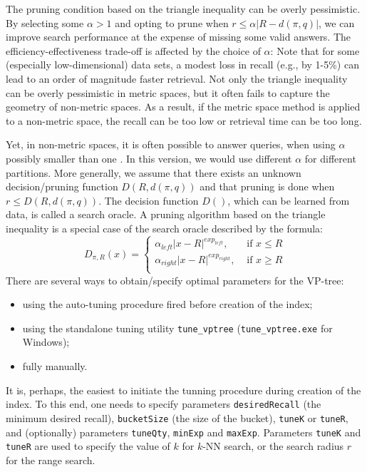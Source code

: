 \documentclass[runningheads,a4paper]{llncs}
\newcommand{\ttt}[1]{\texttt{#1}}
\newcommand{\knn}{$k$-NN }
\begin{document}
{The pruning condition based on the triangle inequality can be overly pessimistic.
By selecting some $\alpha > 1$ and opting to prune when $r \le \alpha |R - d(\pi, q)|$,
we can improve search performance at the expense of missing some valid answers.
The efficiency-effectiveness trade-off is affected by the choice of $\alpha$:
Note that for some (especially low-dimensional) data sets, a modest
loss in recall (e.g., by 1-5\%) can lead to an order of magnitude faster retrieval.
Not only the triangle inequality can be overly pessimistic in metric spaces, 
but it often fails to capture the geometry of non-metric spaces.
As a result, if the metric space method is applied to a non-metric space,
the recall can be too low or retrieval time can be too long.

Yet, in non-metric spaces, 
it is often possible to answer queries, 
when using $\alpha$ possibly smaller than one \cite{Boytsov_and_Bilegsaikhan:nips2013,naidan2015permutation}.
In this version, we would use different $\alpha$ for different partitions.
More generally, we assume that there exists an unknown decision/pruning function $D(R, d(\pi, q))$ and
that pruning is done when $r \le D(R, d(\pi, q))$.
The decision function $D()$, which can be learned from data, is called a search oracle.
A pruning algorithm based on the triangle inequality 
is a special case of the search oracle described by the formula:
\begin{equation}\label{EqDecFunc}
D_{\pi,R}(x) = \left\{
\begin{array}{ll}
\alpha_{left} |x - R|^{{exp}_{left}},  & \mbox{ if }x \le R\\
\alpha_{right} |x - R|^{{exp}_{right}}, & \mbox{ if }x \ge R\\
\end{array}
\right.
\end{equation}
There are several ways to obtain/specify optimal parameters for the VP-tree: 
\begin{itemize} 
\item using the auto-tuning procedure fired before creation of the index; 
\item using the standalone tuning utility \texttt{tune\_vptree} (\texttt{tune\_vptree.exe} for Windows);
\item fully manually.
\end{itemize}


It is, perhaps, the easiest to initiate the tunning procedure during creation of the index.
To this end, one needs to specify parameters \texttt{desiredRecall} (the minimum desired recall), \texttt{bucketSize} (the size 
of the bucket), \texttt{tuneK} or \texttt{tuneR}, and (optionally) parameters \texttt{tuneQty}, \ttt{minExp} and \ttt{maxExp}. 
Parameters \texttt{tuneK} and \texttt{tuneR} are used to specify the value of $k$ for \knn search,
or the search radius $r$ for the range search.

}
\end{document}
